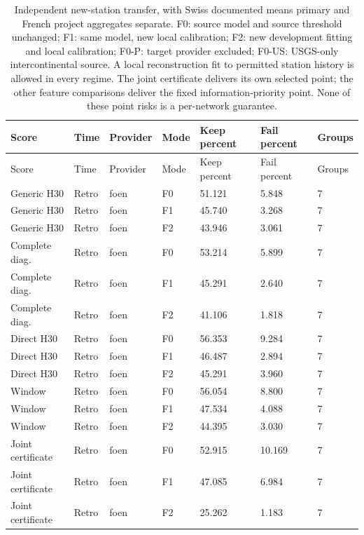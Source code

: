 {\tabletext
\setlength{\tabcolsep}{3pt}
\begin{longtable}{p{}p{}p{}p{}p{}p{}p{}}
\caption{Independent new-station transfer, with Swiss documented means primary and French project aggregates separate. F0: source model and source threshold unchanged; F1: same model, new local calibration; F2: new development fitting and local calibration; F0-P: target provider excluded; F0-US: USGS-only intercontinental source. A local reconstruction fit to permitted station history is allowed in every regime. The joint certificate delivers its own selected point; the other feature comparisons deliver the fixed information-priority point. None of these point risks is a per-network guarantee.}\label{tab:r3si-transfer}\\
\toprule
Score & Time & Provider & Mode & Keep percent & Fail percent & Groups \\
\midrule
\endfirsthead
\toprule
Score & Time & Provider & Mode & Keep percent & Fail percent & Groups \\
\midrule
\endhead
Generic H30 & Retro & foen & F0 & 51.121 & 5.848 & 7 \\
Generic H30 & Retro & foen & F1 & 45.740 & 3.268 & 7 \\
Generic H30 & Retro & foen & F2 & 43.946 & 3.061 & 7 \\
Complete diag. & Retro & foen & F0 & 53.214 & 5.899 & 7 \\
Complete diag. & Retro & foen & F1 & 45.291 & 2.640 & 7 \\
Complete diag. & Retro & foen & F2 & 41.106 & 1.818 & 7 \\
Direct H30 & Retro & foen & F0 & 56.353 & 9.284 & 7 \\
Direct H30 & Retro & foen & F1 & 46.487 & 2.894 & 7 \\
Direct H30 & Retro & foen & F2 & 45.291 & 3.960 & 7 \\
Window & Retro & foen & F0 & 56.054 & 8.800 & 7 \\
Window & Retro & foen & F1 & 47.534 & 4.088 & 7 \\
Window & Retro & foen & F2 & 44.395 & 3.030 & 7 \\
Joint certificate & Retro & foen & F0 & 52.915 & 10.169 & 7 \\
Joint certificate & Retro & foen & F1 & 47.085 & 6.984 & 7 \\
Joint certificate & Retro & foen & F2 & 25.262 & 1.183 & 7 \\

\end{longtable}}

